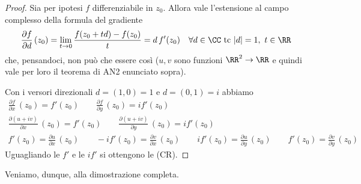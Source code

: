 \begin{proof}
Sia per ipotesi $f$ differenziabile in $z_0$. Allora vale l'estensione al campo complesso della formula del gradiente
\begin{equation*}
\frac{\partial f}{\partial d}\,(z_0)=\lim_{t\to 0}\frac{f(z_0+td)-f(z_0)}{t}=d\,f'(z_0)\quad \forall d\in\CC\text{ tc }|d|=1,\ t\in\RR
\end{equation*}
che, pensandoci, non può che essere così ($u,v$ sono funzioni $\RR^2\to\RR$ e quindi vale per loro il teorema di AN2 enunciato sopra). 

Con i versori direzionali $d=(1,0)=1$ e $d=(0,1)=i$ abbiamo
\begin{gather*}
\frac{\partial f}{\partial x}\,(z_0)=f'(z_0) \qquad \frac{\partial f}{\partial y}\,(z_0)=if'(z_0) \\
\frac{\partial (u+iv)}{\partial x}\,(z_0)=f'(z_0) \qquad \frac{\partial (u+iv)}{\partial y}\,(z_0)=if'(z_0) \\
f'(z_0)=\frac{\partial u}{\partial x}\,(z_0) \qquad -if'(z_0)=\frac{\partial v}{\partial x}\,(z_0) \qquad if'(z_0)=\frac{\partial u}{\partial y}\,(z_0)\qquad f'(z_0)=\frac{\partial v}{\partial y}\,(z_0)
\end{gather*}
Uguagliando le $f'$ e le $if'$ si ottengono le (CR).
\end{proof}

\newpage

Veniamo, dunque, alla dimostrazione completa.

